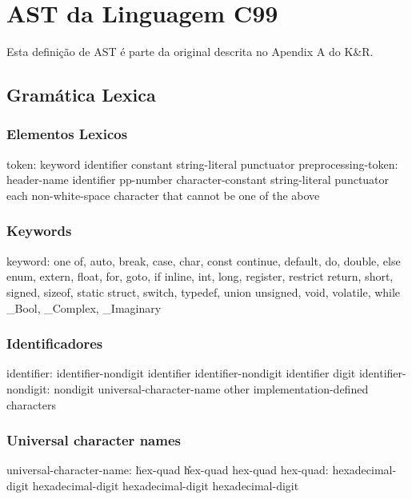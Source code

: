 \chapter{AST da Linguagem \textrm{C99}}\label{chap:ast}
\minitoc
Esta definição de AST é parte da original descrita no Apendix A do K\&R\cite{ker}.
\section{Gramática Lexica}
\subsection{Elementos Lexicos}

\begin{code_files}
token:
	keyword
	identifier
	constant
	string-literal
	punctuator
preprocessing-token:
	header-name
	identifier
	pp-number
	character-constant
	string-literal
	punctuator
	each non-white-space character that cannot be one of the above
\end{code_files}

\subsection{Keywords}
\begin{code_files}
keyword:
	one of, auto, break, case, char, const
	continue, default, do, double, else
	enum, extern, float, for, goto, if
	inline, int, long, register, restrict
	return, short, signed, sizeof, static
	struct, switch, typedef, union
	unsigned, void, volatile, while
	_Bool, _Complex, _Imaginary
\end{code_files}

\subsection{Identificadores}
\begin{code_files}
identifier:
	identifier-nondigit
	identifier identifier-nondigit
	identifier digit
identifier-nondigit:
	nondigit
	universal-character-name
	other implementation-defined characters
\end{code_files}

\subsection{Universal character names}
\begin{code_files}
universal-character-name:
	\u hex-quad
	\U hex-quad hex-quad
hex-quad:
	hexadecimal-digit hexadecimal-digit
	hexadecimal-digit hexadecimal-digit
\end{code_files}

